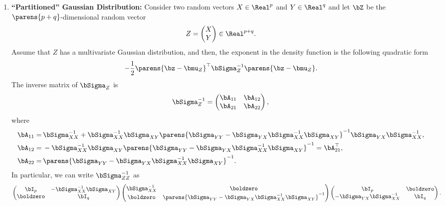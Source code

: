 \documentclass[12pt]{article}
\begin{document}
\begin{enumerate}[label=\textbf{\arabic*.}]
	\item \textbf{``Partitioned'' Gaussian Distribution:} Consider two random vectors $X \in \Real^p$ and $Y \in \Real^q$ and let $\bZ$ be the $\parens{p+q}$-dimensional random vector
	\begin{align*}
		Z = \begin{pmatrix}
			X \\ Y
		\end{pmatrix} \in \Real^{p+q}. 
	\end{align*}
	Assume that $Z$ has a multivariate Gaussian distribution, and then, the exponent in the density function is the following quadratic form
	\begin{align*}
		-\frac{1}{2} \parens{\bz - \bmu_{Z}}^\top \bSigma_{Z}^{-1} \parens{\bz - \bmu_{Z}}. 
	\end{align*}
	The inverse matrix of $\bSigma_{Z}$ is 
	\begin{align*}
		\bSigma_{Z}^{-1} = \begin{pmatrix}
			\bA_{11} & \bA_{12} \\ \bA_{21} & \bA_{22}
		\end{pmatrix}, 
	\end{align*}
	where 
	\begin{align*}
	\bA_{11} = & \, \bSigma_{XX}^{-1} + \bSigma_{XX}^{-1} \bSigma_{XY} \parens{\bSigma_{YY} - \bSigma_{YX} \bSigma_{XX}^{-1} \bSigma_{XY}}^{-1} \bSigma_{YX} \bSigma_{XX}^{-1},  \\ 
	\bA_{12} = & \, - \bSigma_{XX}^{-1} \bSigma_{XY} \parens{\bSigma_{YY} - \bSigma_{YX} \bSigma_{XX}^{-1} \bSigma_{XY}}^{-1} = \bA_{21}^\top, \\ 
	\bA_{22} = & \, \parens{\bSigma_{YY} - \bSigma_{YX} \bSigma_{XX}^{-1} \bSigma_{XY}}^{-1}. 
	\end{align*}
	In particular, we can write $\bSigma_{ZZ}^{-1}$ as 
	\begin{align*}
		\begin{pmatrix}
			\bI_p & - \bSigma_{XX}^{-1} \bSigma_{XY} \\ 
			\boldzero & \bI_q
		\end{pmatrix} 
		\begin{pmatrix}
			\bSigma_{XX}^{-1} & \boldzero \\ 
			\boldzero & \parens{\bSigma_{YY} - \bSigma_{YX} \bSigma_{XX}^{-1} \bSigma_{XY}}^{-1}
		\end{pmatrix} 
		\begin{pmatrix}
			\bI_p & \boldzero \\ 
			- \bSigma_{YX} \bSigma_{XX}^{-1} & \bI_q
		\end{pmatrix}. 
	\end{align*}
	

\end{enumerate}
\end{document}
